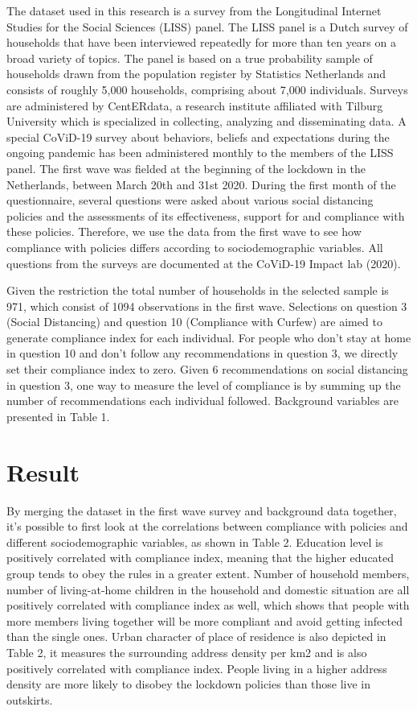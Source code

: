 \documentclass{article}
\begin{document}
The dataset used in this research is a survey from the Longitudinal Internet Studies for the Social Sciences (LISS) panel. The LISS panel is a Dutch survey of households that have been interviewed repeatedly for more than ten years on a broad variety of topics. The panel is based on a true probability sample of households drawn from the population register by Statistics Netherlands and consists of roughly 5,000 households, comprising about 7,000 individuals. Surveys are administered by CentERdata, a research institute affiliated with Tilburg University which is specialized in collecting, analyzing and disseminating data. 
A special CoViD-19 survey about behaviors, beliefs and expectations during the ongoing pandemic has been administered monthly to the members of the LISS panel. The first wave was fielded at the beginning of the lockdown in the Netherlands, between March 20th and 31st 2020. During the first month of the questionnaire, several questions were asked about various social distancing policies and the assessments of its effectiveness, support for and compliance with these policies. Therefore, we use the data from the first wave to see how compliance with policies differs according to sociodemographic variables. All questions from the surveys are documented at the CoViD-19 Impact lab (2020).

Given the restriction the total number of households in the selected sample is 971, which consist of 1094 observations in the first wave.
Selections on question 3 (Social Distancing) and question 10 (Compliance with Curfew) are aimed to generate compliance index for each individual. For people who don’t stay at home in question 10 and don’t follow any recommendations in question 3, we directly set their compliance index to zero. Given 6 recommendations on social distancing in question 3, one way to measure the level of compliance is by summing up the number of recommendations each individual followed.
Background variables are presented in Table 1.

\section{Result}


By merging the dataset in the first wave survey and background data together, it’s possible to first look at the correlations between compliance with policies and different sociodemographic variables, as shown in Table 2. Education level is positively correlated with compliance index, meaning that the higher educated group tends to obey the rules in a greater extent. Number of household members, number of living-at-home children in the household and domestic situation are all positively correlated with compliance index as well, which shows that people with more members living together will be more compliant and avoid getting infected than the single ones. Urban character of place of residence is also depicted in Table 2, it measures the surrounding address density per km2 and is also positively correlated with compliance index. People living in a higher address density are more likely to disobey the lockdown policies than those live in outskirts.
\end{document}
